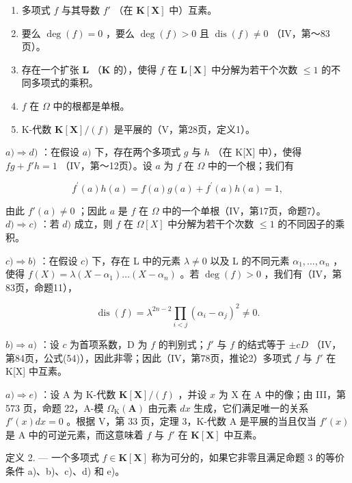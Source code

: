 \begin{enumerate}
\def\labelenumi{\alph{enumi})}
\item
  多项式 \(f\) 与其导数 \(f'\) （在 \(\mathbf{K}[\mathbf{X}]\) 中）互素。
\item
  要么 \(\deg(f) = 0\) ，要么 \(\deg(f) > 0\) 且 \(\operatorname{dis}(f) \neq 0\) （IV，第～83页）。
\item
  存在一个扩张 \(\mathbf{L}\) （\(\mathbf{K}\) 的），使得 \(f\) 在 \(\mathbf{L}[\mathbf{X}]\) 中分解为若干个次数 \(\leqslant 1\) 的不同多项式的乘积。
\item
  \(f\) 在 \(\Omega\) 中的根都是单根。
\item
  K-代数 \(\mathbf{K}[\mathbf{X}] / (f)\) 是平展的（V，第28页，定义1）。
\end{enumerate}

\(a) \Rightarrow d)\) ：在假设 \(a)\) 下，存在两个多项式 \(g\) 与 \(h\) （在 K{[}X{]} 中），使得 \(fg + f'h = 1\) （IV，第～12页）。设 \(a\) 为 \(f\) 在 \(\Omega\) 中的一个根；我们有

\[
f ^ {\prime} (a) h (a) = f (a) g (a) + f ^ {\prime} (a) h (a) = 1,
\]

由此 \(f'(a) \neq 0\) ；因此 \(a\) 是 \(f\) 在 \(\Omega\) 中的一个单根（IV，第17页，命题7）。 \(d) \Rightarrow c)\) ：若 \(d)\) 成立，则 \(f\) 在 \(\Omega[X]\) 中分解为若干个次数 \(\leqslant 1\) 的不同因子的乘积。

\(c) \Rightarrow b)\) ：在假设 \(c)\) 下，存在 L 中的元素 \(\lambda \neq 0\) 以及 L 的不同元素 \(\alpha_{1}, \ldots, \alpha_{n}\) ，使得 \(f(X) = \lambda(X - \alpha_{1}) \ldots (X - \alpha_{n})\) 。若 \(\deg(f) > 0\) ，我们有（IV，第83页，命题11），

\[
\operatorname{dis} (f) = \lambda^ {2 n - 2} \prod_ {i <   j} (\alpha_ {i} - \alpha_ {j}) ^ {2} \neq 0.
\]

\(b) \Rightarrow a)\) ：设 \(c\) 为首项系数，D 为 \(f\) 的判别式；\(f'\) 与 \(f\) 的结式等于 \(\pm cD\) （IV，第84页，公式(54)），因此非零；因此（IV，第78页，推论2）多项式 \(f\) 与 \(f'\) 在 K{[}X{]} 中互素。

\(a) \Rightarrow e)\) ：设 A 为 K-代数 \(\mathbf{K}[\mathbf{X}] / (f)\) ，并设 \(x\) 为 X 在 A 中的像；由 III，第 573 页，命题 22，A-模 \(\Omega_{\mathrm{K}}(\mathbf{A})\) 由元素 \(dx\) 生成，它们满足唯一的关系 \(f'(x) dx = 0\) 。根据 V，第 33 页，定理 3，K-代数 A 是平展的当且仅当 \(f'(x)\) 是 A 中的可逆元素，而这意味着 \(f\) 与 \(f'\) 在 \(\mathbf{K}[\mathbf{X}]\) 中互素。

定义 2. --- 一个多项式 \(f \in \mathbf{K}[\mathbf{X}]\) 称为可分的，如果它非零且满足命题 3 的等价条件 a)、b)、c)、d) 和 e)。

